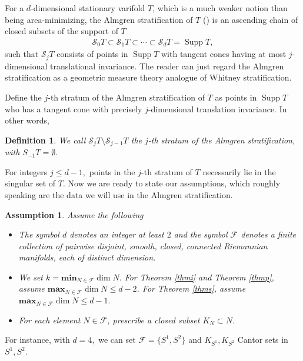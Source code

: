 \documentclass[11pt,a4paper]{amsart}
\numberwithin{equation}{section}
\newcommand{\supp}{\operatorname{Supp}}
\newcommand{\mff}{\mathcal{F}}
\newcommand{\cd}{\cdots}
\newcommand{\s}{\subset}
\theoremstyle{plain}
\newtheorem{assump}[exam]{Assumption}
\newtheorem{defn}[exam]{Definition}
\theoremstyle{definition}
\numberwithin{equation}{subsection}
\begin{document}
For a $d$-dimensional stationary varifold $T$, which is a much weaker notion than being area-minimizing,  the Almgren stratification of $ T$ (\cite{BWst}) is an ascending chain of closed subsets of the support of  $T$
\begin{align*}
\mathcal{S}_0T\s\mathcal{{S}}_1T\s\cd\s\mathcal{S}_dT=\supp T,\end{align*}
such that $\mathcal{S}_j T$ consists of points in $\supp T$ with tangent cones having at most $j$-dimensional translational invariance. The reader can just regard the Almgren stratification as a geometric measure theory analogue of Whitney stratification. 


Define the $j$-th stratum of the Almgren stratification of $T$ as points in $\supp T$ who has a tangent cone with precisely $j$-dimensional translation invariance. In other words,
\begin{defn}
We call $\mathcal{S}_jT\setminus\mathcal{S}_{j-1}T$ the $j$-th stratum of the Almgren stratification, with $S_{-1}T=\emptyset.$
\end{defn}
For integers $j\le d-1,$ points in the $j$-th stratum of $T$ necessarily lie in the singular set of $T.$ Now we are ready to state our assumptions, which roughly speaking are the data we will use in the Almgren stratification.
\begin{assump}\label{assumpmff}Assume the following
\begin{itemize}
\item	The symbol $d$ denotes an integer at least $2$ and the symbol $\mff$ denotes a finite collection of pairwise disjoint, smooth, closed, connected Riemannian manifolds, each of distinct dimension.
\item We set $k=\mathbf{min}_{N\in \mff}\dim N.$ For Theorem \ref{thmi} and Theorem \ref{thmp}, assume $\mathbf{max}_{N\in \mff}\dim N\le d-2$. For Theorem \ref{thms}, assume $\mathbf{max}_{N\in \mff}\dim N\le d-1.$
\item For each element $N\in \mff$, prescribe a closed subset $K_N\s N.$
\end{itemize}
\end{assump}
For instance, with $d=4,$ we can set $\mff=\{S^1,S^2\}$ and $K_{S^1},K_{S^2}$ Cantor sets in $S^1,S^2.$%
\end{document}
